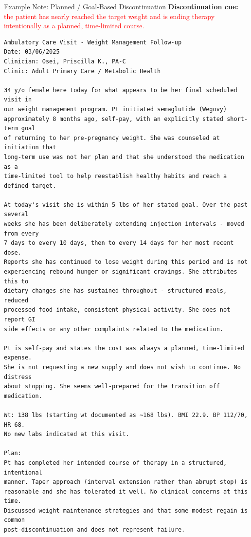 \documentclass[aspectratio=169]{beamer}
\begin{document}
\begin{frame}{Example Note: Planned / Goal-Based Discontinuation}
\tiny
\textbf{Discontinuation cue:}
\textcolor{red}{the patient has nearly reached the target weight and is ending therapy intentionally as a planned, time-limited course.}

\vspace{0.5em}
\begin{verbatim}
Ambulatory Care Visit - Weight Management Follow-up
Date: 03/06/2025
Clinician: Osei, Priscilla K., PA-C
Clinic: Adult Primary Care / Metabolic Health

34 y/o female here today for what appears to be her final scheduled visit in
our weight management program. Pt initiated semaglutide (Wegovy)
approximately 8 months ago, self-pay, with an explicitly stated short-term goal
of returning to her pre-pregnancy weight. She was counseled at initiation that
long-term use was not her plan and that she understood the medication as a
time-limited tool to help reestablish healthy habits and reach a defined target.

At today's visit she is within 5 lbs of her stated goal. Over the past several
weeks she has been deliberately extending injection intervals - moved from every
7 days to every 10 days, then to every 14 days for her most recent dose.
Reports she has continued to lose weight during this period and is not
experiencing rebound hunger or significant cravings. She attributes this to
dietary changes she has sustained throughout - structured meals, reduced
processed food intake, consistent physical activity. She does not report GI
side effects or any other complaints related to the medication.

Pt is self-pay and states the cost was always a planned, time-limited expense.
She is not requesting a new supply and does not wish to continue. No distress
about stopping. She seems well-prepared for the transition off medication.

Wt: 138 lbs (starting wt documented as ~168 lbs). BMI 22.9. BP 112/70, HR 68.
No new labs indicated at this visit.

Plan:
Pt has completed her intended course of therapy in a structured, intentional
manner. Taper approach (interval extension rather than abrupt stop) is
reasonable and she has tolerated it well. No clinical concerns at this time.
Discussed weight maintenance strategies and that some modest regain is common
post-discontinuation and does not represent failure.
\end{verbatim}
\end{frame}
\end{document}

